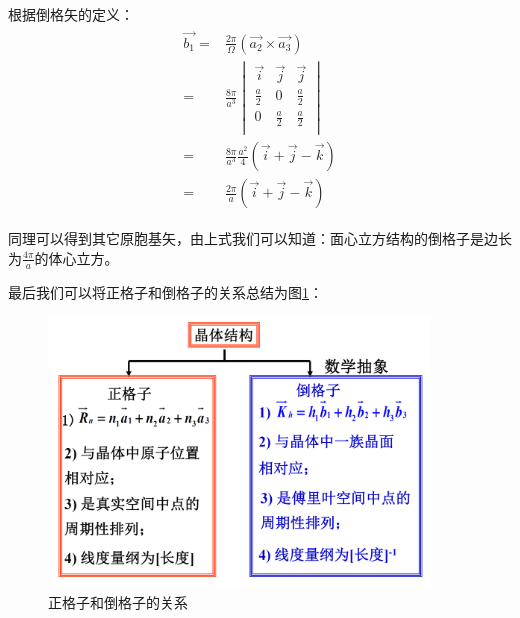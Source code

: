\documentclass{ctexart}
\begin{document}
\begin{enumerate}
            根据倒格矢的定义：
            \begin{align}
                \begin{split}
                    \vec{b_1}=&\frac{2\pi}{\Omega}(\vec{a_2}\times \vec{a_3})\\
                    =&\frac{8\pi}{a^3}\begin{vmatrix}
                    \vec{i} & \vec{j} & \vec{j}\\
                    \frac{a}{2} & 0 & \frac{a}{2}\\
                    0 & \frac{a}{2} & \frac{a}{2} \\
                    \end{vmatrix}\\
                    =& \frac{8\pi}{a^3}\frac{a^2}{4}(\vec{i}+\vec{j}-\vec{k})\\
                    =&\frac{2\pi}{a}(\vec{i}+\vec{j}-\vec{k})
                \end{split}
            \end{align}

            同理可以得到其它原胞基矢，由上式我们可以知道：面心立方结构的倒格子是边长为$\frac{4\pi}{a}$的体心立方。
        \end{enumerate}
        
        最后我们可以将正格子和倒格子的关系总结为图\ref{fig:recipricallattice}：
        \begin{figure}[H]
            \centering
            \includegraphics[width=0.9\textwidth]{figure/recipricallattice.png}
            \caption{正格子和倒格子的关系}
            \label{fig:recipricallattice}
        \end{figure}
        
\end{document}
